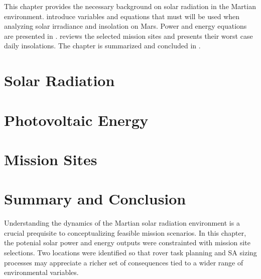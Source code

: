 This chapter provides the necessary background on solar radiation in the Martian environment.  introduce variables and equations that must will be used when analyzing solar irradiance and insolation on Mars. Power and energy equations are presented in .  reviews the selected mission sites and presents their worst case daily insolations. The chapter is summarized and concluded in .

\section{Solar Radiation}
\label{sec:MarsSolarEnergy:SolarRadiation}


\section{Photovoltaic Energy}
\label{sec:MarsSolarEnergy:PhotovoltaicEnergy}


\section{Mission Sites}
\label{sec:MarsSolarEnergy:MissionSites}


\section{Summary and Conclusion}
\label{sec:MarsSolarEnergy:SummaryAndConclusion}
Understanding the dynamics of the Martian solar radiation environment is a crucial prequisite to  conceptualizing feasible mission scenarios. In this chapter, the potenial solar power and energy outputs were constrainted with mission site selections. Two locations were identified so that rover task planning and \ac{SA} sizing processes may appreciate a richer set of consequences tied to a wider range of environmental variables.
